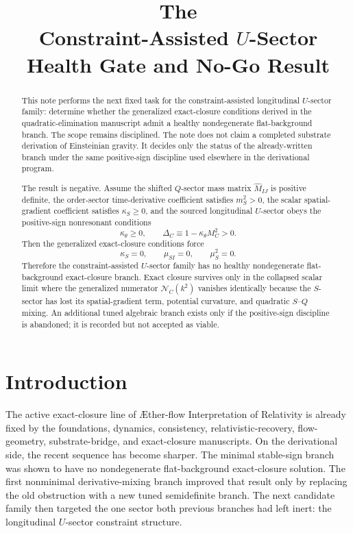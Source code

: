 \documentclass[11pt]{article}
\title{\textbf{The \TheoryName{}}\\[0.4em]
\large Constraint-Assisted \texorpdfstring{\(U\)}{U}-Sector Health Gate and No-Go Result}
\author{}
\date{}
\newcommand{\Aflow}{\AE{}ther-flow}
\newcommand{\TheoryName}{\Aflow{} Interpretation of Relativity}
\begin{document}
\maketitle

\begin{abstract}
This note performs the next fixed task for the constraint-assisted longitudinal \(U\)-sector family: determine whether the generalized exact-closure conditions derived in the quadratic-elimination manuscript admit a healthy nondegenerate flat-background branch. The scope remains disciplined. The note does not claim a completed substrate derivation of Einsteinian gravity. It decides only the status of the already-written branch under the same positive-sign discipline used elsewhere in the derivational program.

The result is negative. Assume the shifted \(Q\)-sector mass matrix \(\widehat M_{IJ}\) is positive definite, the order-sector time-derivative coefficient satisfies \(m_S^2>0\), the scalar spatial-gradient coefficient satisfies \(\kappa_S\ge 0\), and the sourced longitudinal \(U\)-sector obeys the positive-sign nonresonant conditions
\[
\kappa_\theta\ge 0,
\qquad
\Delta_C\equiv 1-\kappa_\theta M_C^2>0.
\]
Then the generalized exact-closure conditions force
\[
\kappa_S=0,
\qquad
\mu_{SI}=0,
\qquad
\mu_S^2=0.
\]
Therefore the constraint-assisted \(U\)-sector family has no healthy nondegenerate flat-background exact-closure branch. Exact closure survives only in the collapsed scalar limit where the generalized numerator \(\mathcal N_C(k^2)\) vanishes identically because the \(S\)-sector has lost its spatial-gradient term, potential curvature, and quadratic \(S\)--\(Q\) mixing. An additional tuned algebraic branch exists only if the positive-sign discipline is abandoned; it is recorded but not accepted as viable.
\end{abstract}

\section{Introduction}

The active exact-closure line of \TheoryName{} is already fixed by the foundations, dynamics, consistency, relativistic-recovery, flow-geometry, substrate-bridge, and exact-closure manuscripts. On the derivational side, the recent sequence has become sharper. The minimal stable-sign branch was shown to have no nondegenerate flat-background exact-closure solution. The first nonminimal derivative-mixing branch improved that result only by replacing the old obstruction with a new tuned semidefinite branch. The next candidate family then targeted the one sector both previous branches had left inert: the longitudinal \(U\)-sector constraint structure.
\end{document}
